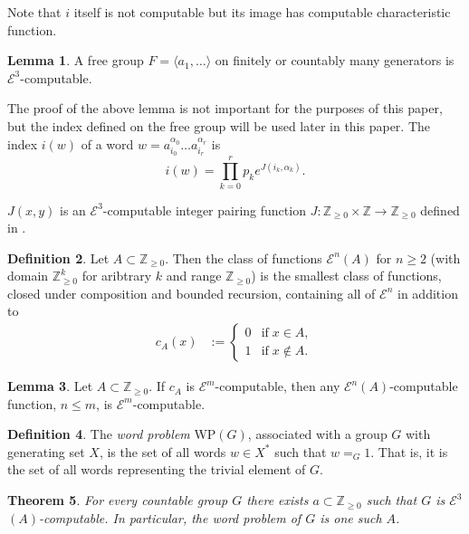 \documentclass[a4paper]{article}
\newcommand{\grz}[1]{$\mathcal{E}^{#1}$}	%
\newcommand{\ZZ}{\mathbb{Z}}
\theoremstyle{plain}
\newtheorem{theorem}{Theorem}[section]
\theoremstyle{definition}
\newtheorem{lemma}[theorem]{Lemma}
\newtheorem{definition}[theorem]{Definition}
\begin{document}
Note that $i$ itself is not computable but its image has computable characteristic function.

\begin{lemma}\cite[3.1]{Cannonito_1973}
	A free group $F = \langle a_1, \dots \rangle$ on finitely or countably many generators is \grz{3}-computable.
\end{lemma}

The proof of the above lemma is not important for the purposes of this paper, but the index defined on the free group will be used later in this paper. The index $i(w)$ of a word $w = a_{i_0}^{\alpha_0} \dots a_{i_r}^{\alpha_r}$ is
\[ i(w) = \prod_{k=0}^r p_k e^{J(i_k,\alpha_k)}. \]

$J(x,y)$ is an \grz{3}-computable integer pairing function $J:\ZZ_{\geq 0} \times \ZZ \rightarrow \ZZ_{\geq 0}$ defined in \cite{Cannonito_1973}.


\begin{definition} \cite[2.3]{Cannonito_1973}
	Let $A \subset \ZZ_{\geq 0}$. Then the class of functions \grz{n}$(A)$ for $n \geq 2$ (with domain $\ZZ_{\geq 0}^k$ for aribtrary $k$ and range $\ZZ_{\geq 0}$) is the smallest class of functions, closed under composition and bounded recursion, containing all of \grz{n} in addition to 
	\begin{align}
		c_A(x) &:= \begin{cases}
									0 & \textrm{if}\; x \in A, \\
									1 & \textrm{if}\;  x \notin A.
							\end{cases}
	\end{align}
\end{definition}
 
\begin{lemma} \label{relativetonormalcomputable}
	Let $A \subset \ZZ_{\geq 0}$. If $c_A$ is \grz{m}-computable, then any \grz{n}$(A)$-computable function, $n \leq m$, is \grz{m}-computable.
\end{lemma}

\begin{definition}
	The {\it word problem} WP$(G)$, associated with a group $G$ with generating set $X$, is the set of all words $w \in X^{\ast}$ such that $w =_G 1$. That is, it is the set of all words representing the trivial element of $G$.
\end{definition}

\begin{theorem} \cite[3.2]{Cannonito_1973} \label{wp-computable-implies-group}
	For every countable group $G$ there exists $a \subset \ZZ_{\geq 0}$ such that $G$ is \grz{3}$(A)$-computable. In particular, the word problem of $G$ is one such $A$.
\end{theorem}
\end{document}
